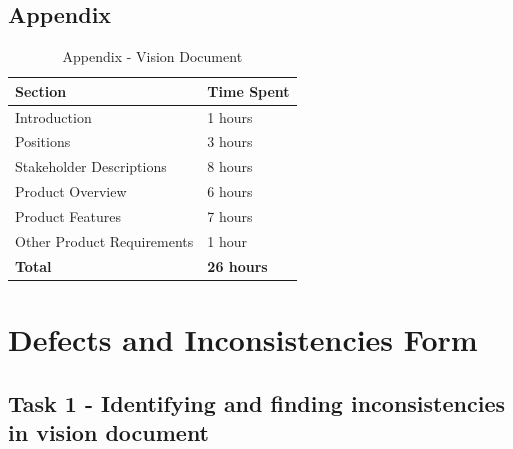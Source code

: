 \documentclass{report}
\begin{document}
\section{Appendix}
\begin{table}[htb!]
    \centering
    \begin{tabular}{|p{5.5cm}|p{6.5cm}|}\hline
    \textbf{Section} & \textbf{Time Spent} \\ \hline
    Introduction & 1 hours \\ \hline
    Positions & 3 hours \\ \hline
    Stakeholder Descriptions & 8 hours \\ \hline
    Product Overview & 6 hours \\ \hline
    Product Features & 7 hours \\ \hline
    Other Product Requirements & 1 hour \\ \hline
    \textbf{Total} & \textbf{26 hours} \\ \hline
\end{tabular}
    \caption{Appendix - Vision Document}
    \label{tab:my_label}
\end{table}

\chapter{Defects and Inconsistencies Form}
\section{Task 1 - Identifying and finding inconsistencies in vision document}
\end{document}
